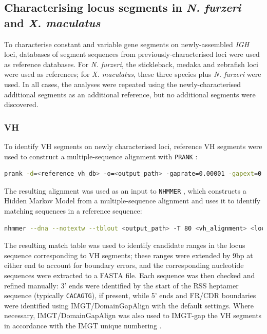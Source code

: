 \subsection{Characterising locus segments in \textit{N. furzeri} and \textit{X. maculatus}}

To characterise constant and variable gene segments on newly-assembled \textit{IGH} loci, databases of segment sequences from previously-characterised loci were used as reference databases. For \textit{N. furzeri}, the stickleback, medaka and zebrafish loci were used as references; for \textit{X. maculatus}, these three species plus \textit{N. furzeri} were used. In all cases, the analyses were repeated using the newly-characterised additional segments as an additional reference, but no additional segments were discovered.

\subsubsection{VH}

To identify VH segments on newly characterised loci, reference VH segments were used to construct a multiple-sequence alignment with \lstinline{PRANK} \citep{loytynoja2014prank}:

\begin{lstlisting}[language=bash]
prank -d=<reference_vh_db> -o=<output_path> -gaprate=0.00001 -gapext=0.00001 -F -termgap
\end{lstlisting}

The resulting alignment was used as an input to \lstinline{NHMMER} \citep{wheeler2013nhmmer,eddy2011hmm,eddy2009homology,eddy2008alignment}, which constructs a Hidden Markov Model from a multiple-sequence alignment and uses it to identify matching sequences in a reference sequence:

\begin{lstlisting}[language=bash]
nhmmer --dna --notextw --tblout <output_path> -T 80 <vh_alignment> <locus_sequence_path>
\end{lstlisting}

The resulting match table was used to identify candidate ranges in the locus sequence corresponding to VH segments; these ranges were extended by 9bp at either end to account for boundary errors, and the corresponding nucleotide sequences were extracted to a FASTA file. Each sequence was then checked and refined manually: 3' ends were identified by the start of the RSS heptamer sequence (typically \texttt{CACAGTG}), if present, while 5' ends and FR/CDR boundaries were identified using IMGT/DomainGapAlign \citep{ehrenmann2011domaingapalign} with the default settings. Where necessary, IMGT/DomainGapAlign was also used to IMGT-gap the VH segments in accordance with the IMGT unique numbering \citep{lefranc2003vnumbering}. %


